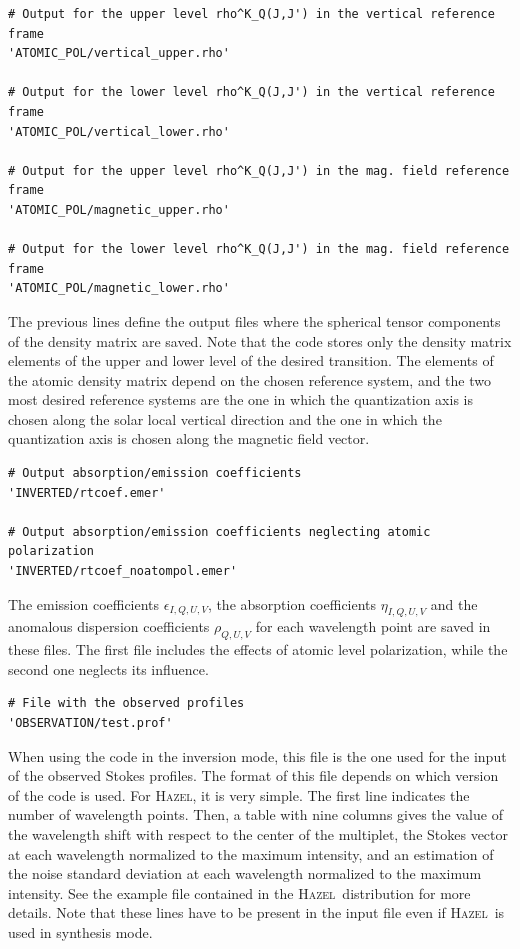 \documentclass[12pt]{article}
\def\H{\textsc{Hazel}}
\begin{document}
\begin{verbatim}
# Output for the upper level rho^K_Q(J,J') in the vertical reference frame
'ATOMIC_POL/vertical_upper.rho'

# Output for the lower level rho^K_Q(J,J') in the vertical reference frame
'ATOMIC_POL/vertical_lower.rho'

# Output for the upper level rho^K_Q(J,J') in the mag. field reference frame
'ATOMIC_POL/magnetic_upper.rho'

# Output for the lower level rho^K_Q(J,J') in the mag. field reference frame
'ATOMIC_POL/magnetic_lower.rho'
\end{verbatim}
The previous lines define the output files where the spherical tensor components of the
density matrix are saved. Note that the code stores only the density matrix elements of the upper and
lower level of the desired transition. The elements of the atomic density matrix depend on the chosen
reference system, and the two most desired reference systems are the one in which the
quantization axis is chosen along the solar local vertical direction and the one
in which the quantization axis is chosen along the magnetic field vector.

\begin{verbatim}
# Output absorption/emission coefficients
'INVERTED/rtcoef.emer'

# Output absorption/emission coefficients neglecting atomic polarization
'INVERTED/rtcoef_noatompol.emer'
\end{verbatim}
The emission coefficients $\epsilon_{I,Q,U,V}$, the absorption coefficients $\eta_{I,Q,U,V}$ and the anomalous
dispersion coefficients $\rho_{Q,U,V}$ for each wavelength point are saved in these files. The first file includes
the effects of atomic level polarization, while the second one neglects its influence.

\begin{verbatim}
# File with the observed profiles
'OBSERVATION/test.prof'
\end{verbatim}
When using the code in the inversion mode, this file is the one used for the input
of the observed Stokes profiles. The format of this file depends on which version of
the code is used. For \H, it is very simple. The first line
indicates the number of wavelength points. Then, a table with nine columns gives the value
of the wavelength shift with respect to the center of the multiplet, the Stokes vector
at each wavelength normalized to the maximum intensity, and an estimation of the noise standard deviation at each wavelength
normalized to the maximum intensity. See the example file contained in the \H\ distribution for more details.
Note that these lines have to be present in the input file even if \H\ is used in synthesis mode.
\end{document}
